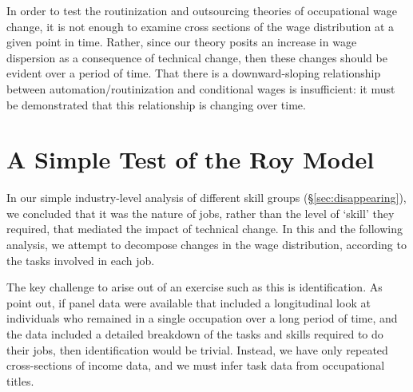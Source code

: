 In order to test the routinization and outsourcing theories of occupational wage change, it is not enough to examine cross sections of the wage distribution at a given point in time. Rather, since our theory posits an increase in wage dispersion as a consequence of technical change, then these changes should be evident over a period of time. That there is a downward-sloping relationship between automation/routinization and conditional wages is insufficient: it must be demonstrated that this relationship is changing over time.

\section{A Simple Test of the Roy Model}\label{sec:direct}

In our simple industry-level analysis of different skill groups (\S\ref{sec:disappearing}), we concluded that it was the nature of jobs, rather than the level of `skill' they required, that mediated the impact of technical change. In this and the following analysis, we attempt to decompose changes in the wage distribution, according to the tasks involved in each job.

The key challenge to arise out of an exercise such as this is identification. As \citet{Fortin2011} point out, if panel data were available that included a longitudinal look at individuals who remained in a single occupation over a long period of time, and the data included a detailed breakdown of the tasks and skills required to do their jobs, then identification would be trivial. Instead, we have only repeated cross-sections of income data, and we must infer task data from occupational titles. 

